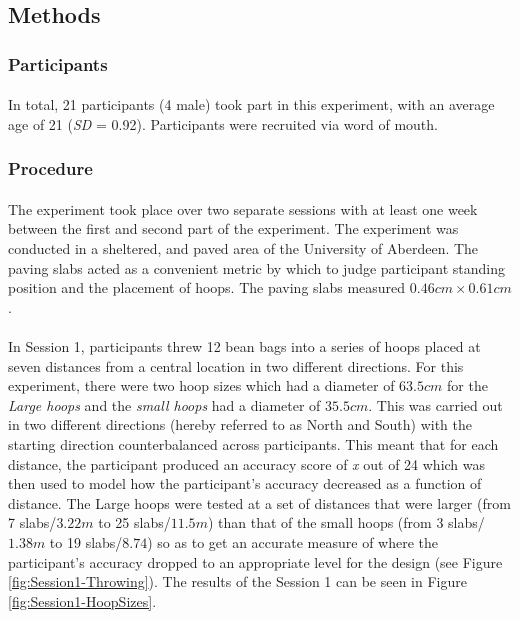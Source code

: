 \documentclass[12pt]{article}
\begin{document}
\subsection*{Methods}
\subsubsection*{Participants}
\paragraph{} In total, 21 participants (4 male) took part in this experiment, with an average age of 21 (\textit{SD} = 0.92). Participants were recruited via word of mouth.

\subsubsection*{Procedure}
\paragraph{} The experiment took place over two separate sessions with at least one week between the first and second part of the experiment. The experiment was conducted in a sheltered, and paved area of the University of Aberdeen. The paving slabs acted as a convenient metric by which to judge participant standing position and the placement of hoops. The paving slabs measured $0.46cm \times 0.61cm$.

\paragraph{} In Session 1, participants threw 12 bean bags into a series of hoops placed at seven distances from a central location in two different directions. For this experiment, there were two hoop sizes which had a diameter of $63.5cm$ for the \textit{Large hoops} and the \textit{small hoops} had a diameter of $35.5cm$. This was carried out in two different directions (hereby referred to as North and South) with the starting direction counterbalanced across participants. This meant that for each distance, the participant produced an accuracy score of \textit{x} out of 24 which was then used to model how the participant's accuracy decreased as a function of distance. The Large hoops were tested at a set of distances that were larger (from 7 slabs/$3.22m$ to 25 slabs/$11.5m$) than that of the small hoops (from 3 slabs/$1.38m$ to 19 slabs/$8.74$) so as to get an accurate measure of where the participant's accuracy dropped to an appropriate level for the design (see Figure \ref{fig:Session1-Throwing}). The results of the Session 1 can be seen in Figure \ref{fig:Session1-HoopSizes}.
\end{document}
